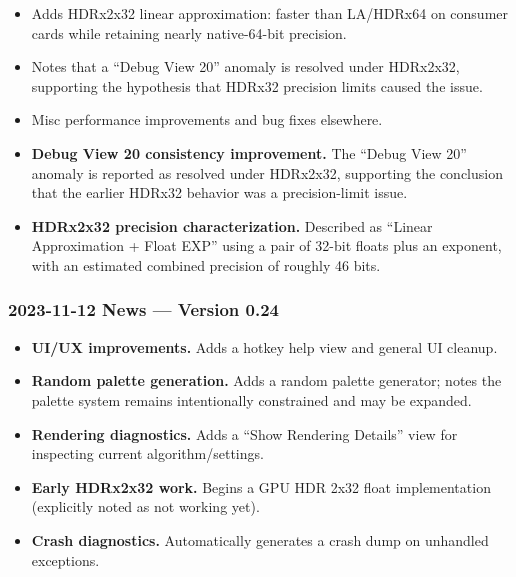 \begin{itemize}
  
  \item Adds HDRx2x32 linear approximation: faster than LA/HDRx64 on consumer
  cards while retaining nearly native-64-bit precision.
  
  \item Notes that a “Debug View 20” anomaly is resolved under HDRx2x32,
  supporting the hypothesis that HDRx32 precision limits caused the issue.
  
  \item Misc performance improvements and bug fixes elsewhere.

  \item \textbf{Debug View 20 consistency improvement.} The ``Debug View 20''
  anomaly is reported as resolved under HDRx2x32, supporting the conclusion that
  the earlier HDRx32 behavior was a precision-limit issue.

  \item \textbf{HDRx2x32 precision characterization.} Described as ``Linear
  Approximation + Float EXP'' using a pair of 32-bit floats plus an exponent,
  with an estimated combined precision of roughly 46 bits.

\end{itemize}


\subsubsection{2023-11-12 News --- Version 0.24}

\begin{itemize}
\item \textbf{UI/UX improvements.} Adds a hotkey help view and general UI
cleanup.
\item \textbf{Random palette generation.} Adds a random palette generator; notes
the palette system remains intentionally constrained and may be expanded.
\item \textbf{Rendering diagnostics.} Adds a ``Show Rendering Details'' view for
inspecting current algorithm/settings.
\item \textbf{Early HDRx2x32 work.} Begins a GPU HDR 2x32 float implementation
(explicitly noted as not working yet).
\item \textbf{Crash diagnostics.} Automatically generates a crash dump on
unhandled exceptions.
\end{itemize}


